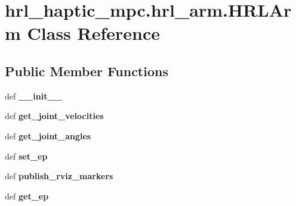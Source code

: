 \hypertarget{classhrl__haptic__mpc_1_1hrl__arm_1_1_h_r_l_arm}{\section{hrl\-\_\-haptic\-\_\-mpc.\-hrl\-\_\-arm.\-H\-R\-L\-Arm \-Class \-Reference}
\label{classhrl__haptic__mpc_1_1hrl__arm_1_1_h_r_l_arm}
}
\subsection*{\-Public \-Member \-Functions}
\begin{DoxyCompactItemize}
\item 
\hypertarget{classhrl__haptic__mpc_1_1hrl__arm_1_1_h_r_l_arm_a8e6845dcc1c6b7bb59e3df6a4daf870d}{def {\bfseries \-\_\-\-\_\-init\-\_\-\-\_\-}}\label{classhrl__haptic__mpc_1_1hrl__arm_1_1_h_r_l_arm_a8e6845dcc1c6b7bb59e3df6a4daf870d}

\item 
\hypertarget{classhrl__haptic__mpc_1_1hrl__arm_1_1_h_r_l_arm_a64b89db2e02971f313e52c50eff45213}{def {\bfseries get\-\_\-joint\-\_\-velocities}}\label{classhrl__haptic__mpc_1_1hrl__arm_1_1_h_r_l_arm_a64b89db2e02971f313e52c50eff45213}

\item 
\hypertarget{classhrl__haptic__mpc_1_1hrl__arm_1_1_h_r_l_arm_a940e56cd22c5761ddc278f9f93c5f426}{def {\bfseries get\-\_\-joint\-\_\-angles}}\label{classhrl__haptic__mpc_1_1hrl__arm_1_1_h_r_l_arm_a940e56cd22c5761ddc278f9f93c5f426}

\item 
\hypertarget{classhrl__haptic__mpc_1_1hrl__arm_1_1_h_r_l_arm_ac797bee3020fb2b62a390137b2a9b05d}{def {\bfseries set\-\_\-ep}}\label{classhrl__haptic__mpc_1_1hrl__arm_1_1_h_r_l_arm_ac797bee3020fb2b62a390137b2a9b05d}

\item 
\hypertarget{classhrl__haptic__mpc_1_1hrl__arm_1_1_h_r_l_arm_af04c879178136677f9721dd655efbcbf}{def {\bfseries publish\-\_\-rviz\-\_\-markers}}\label{classhrl__haptic__mpc_1_1hrl__arm_1_1_h_r_l_arm_af04c879178136677f9721dd655efbcbf}

\item 
\hypertarget{classhrl__haptic__mpc_1_1hrl__arm_1_1_h_r_l_arm_af3c7bebc3d286fe2aa0c2106fff7913b}{def {\bfseries get\-\_\-ep}}\label{classhrl__haptic__mpc_1_1hrl__arm_1_1_h_r_l_arm_af3c7bebc3d286fe2aa0c2106fff7913b}


\end{DoxyCompactItemize}

